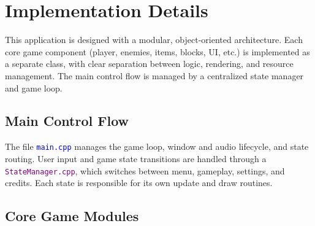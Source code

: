 \section{Implementation Details}
\begin{flushleft}

This application is designed with a modular, object-oriented architecture. Each core game component (player, enemies, items, blocks, UI, etc.) is implemented as a separate class, with clear separation between logic, rendering, and resource management. The main control flow is managed by a centralized state manager and game loop.

\subsection*{Main Control Flow }

The file \texttt{\textcolor{blue}{main.cpp}} manages the game loop, window and audio lifecycle, and state routing. User input and game state transitions are handled through a \texttt{\textcolor{purple}{StateManager.cpp}}, which switches between menu, gameplay, settings, and credits. Each state is responsible for its own update and draw routines.

\subsection*{Core Game Modules}


\end{flushleft}
